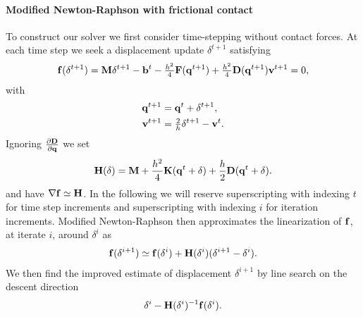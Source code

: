 \paragraph*{Modified Newton-Raphson with frictional contact}
To construct our solver we first consider time-stepping without contact forces. At each time step we seek a displacement update $\delta^{t+1}$ satisfying 
\begin{align}
\mathbf {f}(\delta^{t+1}) = \mathbf {M} \delta^{t+1} - \mathbf {b}^t - \tfrac{h^2}{4} \mathbf {F}(\mathbf {q}^{t+1}) + \tfrac{h^2}{4}  \mathbf {D}(\mathbf {q}^{t+1}) \mathbf {v}^{t+1}=0,
\end{align}
%
with 
\begin{align}
\begin{split}
\mathbf {q}^{t+1} &= \mathbf {q}^t + \mathbf {\delta}^{t+1},\\
\mathbf {v}^{t+1} &= \tfrac{2}{h} \mathbf {\delta}^{t+1} - \mathbf {v}^t.
\end{split}
\end{align}
%
Ignoring $\frac{\partial \mathbf {D}}{\partial \mathbf {q}}$ we set
\begin{align}
\mathbf {H}(\delta)  = \mathbf {M} + \frac{h^2}{4} \mathbf {K}(\mathbf {q}^t + \delta) + \frac{h}{2} \mathbf {D}(\mathbf {q}^t + \delta).
\end{align}
and have $\nabla \mathbf {f} \simeq \mathbf {H}$. In the following we will reserve superscripting with indexing $t$ for time step increments and superscripting with indexing $i$ for iteration increments. Modified Newton-Raphson then approximates the linearization of $\mathbf {f}$, at iterate $i$, around $\delta^i$
as 
\begin{align}
\mathbf {f}(\delta^{i+1}) \simeq   \mathbf {f}(\delta^i) + \mathbf {H}(\delta^i) (\delta^{i+1} - \delta^{i}).
\end{align}
We then find the improved estimate of displacement $\delta^{i+1}$ by line search on the descent direction
\begin{align}
\delta^{i} - \mathbf {H}(\delta^i)^{-1} \mathbf {f}(\delta^i).
\end{align}

